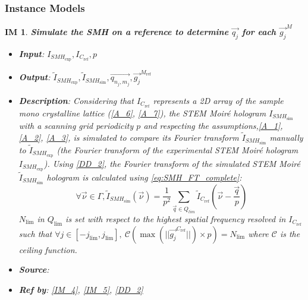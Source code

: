 \documentclass[12pt]{article}
\newtheorem{IM}{IM}
\begin{document}
\subsubsection{Instance Models} \label{sec_instance}    

\renewcommand{\labelitemi}{$-$}

\begin{IM}
\label{IM_1}
\noindent\colorbox{shadecolorIM}{\normalfont \textbf{Simulate the SMH on a reference to determine $\overrightarrow{q_{j}}$ for each $\overrightarrow{g_j}^{M}$}}
\normalfont
\begin{itemize}
\item \textbf{Input}: $I_{\mathit{SMH}_{\text{exp}}},I_{C_{\text{ref}}}, p$
\item \textbf{Output}: $\widetilde{I}_{\mathit{SMH}_{\text{exp}}}, \widetilde{I}_{\mathit{SMH}_{\text{sim}}}, \overrightarrow{q_{n_j,m_j}}, \overrightarrow{g_j}^{M_{\text{ref}}}$
\item \textbf{Description}: Considering that $I_{C_{\text{ref}}}$ represents a 2D array of the sample mono crystalline lattice (\cref{A_6}, \cref{A_7}), the STEM Moir{\'e} hologram $I_{\mathit{SMH}_{\text{sim}}}$ with a scanning grid periodicity $p$ and respecting the assumptions,\cref{A_1}, \cref{A_2}, \cref{A_3}, is simulated to compare its Fourier transform $\widetilde{I}_{\mathit{SMH}_{\text{sim}}}$ manually to $\widetilde{I}_{\mathit{SMH}_{\text{exp}}}$ (the Fourier transform of the experimental STEM Moir{\'e} hologram $I_{\mathit{SMH}_{\text{exp}}}$). Using \cref{DD_2}, the Fourier transform of the simulated STEM Moir{\'e} $\widetilde{I}_{\mathit{SMH}_{\text{sim}}}$ hologram is calculated using \cref{eq:SMH_FT_complete}:
\begin{equation}
\forall \vec{\nu} \in \Gamma, \widetilde{I}_{\mathit{SMH}_{\text{sim}}}(\vec{\nu})=\frac{1}{p^2}\sum_{\vec{q}\in Q_{lim}}\widetilde{I}_{C_{\text{ref}}}(\vec{\nu}-\frac{\vec{q}}{p})
\end{equation}
$N_{\text{lim}}$ in $Q_{\text{lim}}$ is set with respect to the highest spatial frequency resolved in  $I_{C_{\text{ref}}}$ such that $\forall j \in [-j_{\text{lim}},j_{\text{lim}}], \ \mathcal{C}(\max(||\overrightarrow{g_j}^{C_{\text{ref}}}||)\times p) = N_{\text{lim}}$ where $\mathcal{C}$ is the ceiling function.
\item \textbf{Source}: \cite{Pofelski2017}
\item \textbf{Ref by}: \cref{IM_4}, \cref{IM_5}, \cref{DD_2}
\end{itemize}
\end{IM}
\end{document}
